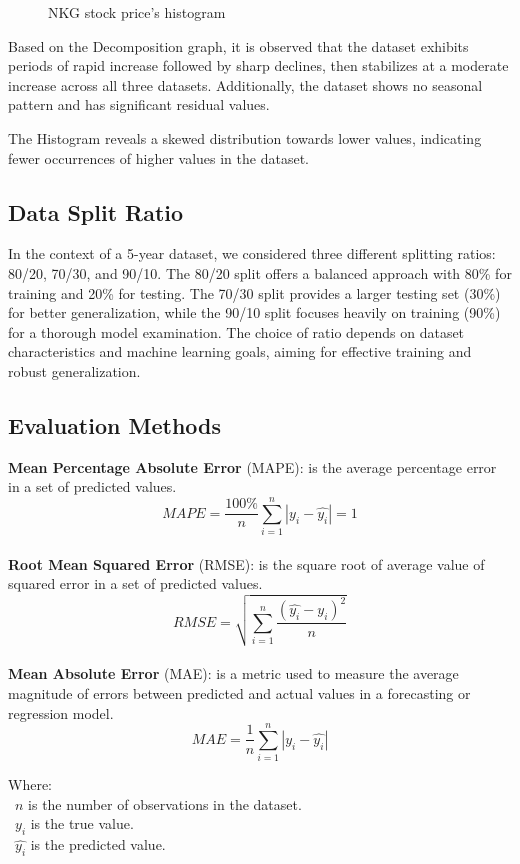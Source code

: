 \documentclass{ieeeojies}
\begin{document}
\begin{figure}[H]
\begin{minipage}{0.23\textwidth}
    \caption{NKG stock price's histogram}
    \label{fig:2}
    \end{minipage}
\end{figure}
Based on the Decomposition graph, it is observed that the dataset exhibits periods of rapid increase followed by sharp declines, then stabilizes at a moderate increase across all three datasets. Additionally, the dataset shows no seasonal pattern and has significant residual values. 

The Histogram reveals a skewed distribution towards lower values, indicating fewer occurrences of higher values in the dataset.
\subsection{Data Split Ratio}
In the context of a 5-year dataset, we considered three different splitting ratios: 80/20, 70/30, and 90/10. The 80/20 split offers a balanced approach with 80\% for training and 20\% for testing. The 70/30 split provides a larger testing set (30\%) for better generalization, while the 90/10 split focuses heavily on training (90\%) for a thorough model examination. The choice of ratio depends on dataset characteristics and machine learning goals, aiming for effective training and robust generalization.
\subsection{Evaluation Methods}
\textbf{Mean Percentage Absolute Error} (MAPE): is the average percentage error in a set of predicted values.\\
\[MAPE=\frac{100\%}{n}  \sum_{i=1}^{n} |y_i-\hat{y_i} |  = 1 \]\\
\textbf{Root Mean Squared Error} (RMSE): is the square root of average value of squared error in a set of predicted values.\\
\[RMSE=\sqrt{\sum_{i=1}^{n} \frac{(\hat{y_i}-y_i )^2}{n} }\]\\
\textbf{Mean Absolute Error} (MAE): is a metric used to measure
the average magnitude of errors between predicted and actual
values in a forecasting or regression model.\\
\[MAE = \frac{1}{n} \sum_{i=1}^n |y_i - \hat{y_i}|\]

Where: \\
	\indent\textbullet\ \(n\) is the number of observations in the dataset.\\
	\indent\textbullet\ \(y_i\)  is the true value.\\
	\indent\textbullet\ \(\hat{y_i}\) is the predicted value.
\end{document}
